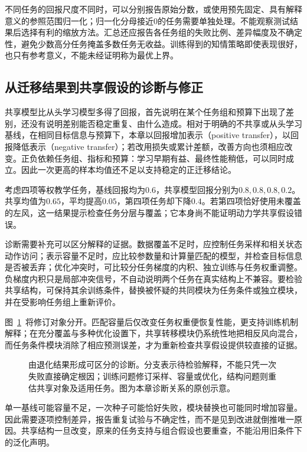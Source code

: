 不同任务的回报尺度不同时，可以分别报告原始分数，或使用预先固定、具有解释意义的参照范围归一化；归一化分母接近0的任务需要单独处理。不能观察测试结果后选择有利的缩放方法。汇总还应报告各任务组的失败比例、差异幅度及不确定性，避免少数高分任务掩盖多数任务无收益。训练得到的知情策略即使表现很好，也只有参考意义，不能未经证明称为最优上界。

\subsection{从迁移结果到共享假设的诊断与修正}
\label{sec:rl-transfer-diagnosis}

共享模型比从头学习模型多得了回报，首先说明在某个任务组和预算下出现了差别，还没有说明差别能否稳定重复、由什么造成。相对于明确的不共享或从头学习基线，在相同目标信息与预算下，本章以回报增加表示（positive transfer），以回报降低表示（negative transfer）；若改用损失或累计差额，改善方向也须相应改变。正负依赖任务组、指标和预算：学习早期有益、最终性能稍低，可以同时成立。因此一次更高的样本均值还不足以支持稳定的正迁移结论。

考虑四项等权教学任务，基线回报均为$0.6$，共享模型回报分别为$0.8,0.8,0.8,0.2$。共享均值为$0.65$，平均提高$0.05$，第四项任务却下降$0.4$。若第四项恰好使用未覆盖的左风，这一结果提示检查任务分层与覆盖；它本身尚不能证明动力学共享假设错误。

诊断需要补充可以区分解释的证据。数据覆盖不足时，应控制任务采样和相关状态动作访问；表示容量不足时，应比较参数量和计算量匹配的模型，并检查目标信息是否被丢弃；优化冲突时，可比较分任务梯度的内积、独立训练与任务权重调整。负梯度内积只是局部冲突信号，不自动说明两个任务在真实结构上不兼容。要检验共享结构，可保持其余训练条件，替换被怀疑的共同模块为任务条件或独立模块，并在受影响任务组上重新评价。

图~\ref{fig:rl-transfer-diagnosis}~将修订对象分开。匹配容量后仅改变任务权重便恢复性能，更支持训练机制解释；在充分覆盖与多种优化设置下，共享转移模块仍系统性地把相反风向混合，而任务条件模块消除了相应预测误差，才为重新检查共享假设提供较直接的证据。

\begin{figure}[htbp]
 \centering
 
 \caption{由退化结果形成可区分的诊断。分支表示待检验解释，不能只凭一次失败直接确定根因；训练问题修订采样、容量或优化，结构问题则重估共享对象及适用任务。图为本章诊断关系的原创示意。}
 \label{fig:rl-transfer-diagnosis}
\end{figure}

单一基线可能容量不足，一次种子可能恰好失败，模块替换也可能同时增加容量。因此需要逐项控制差异，报告重复试验与不确定性，而不是见到改进就倒推唯一原因。共享结构一旦改变，原来的任务支持与组合假设也要重查，不能沿用旧条件下的泛化声明。


